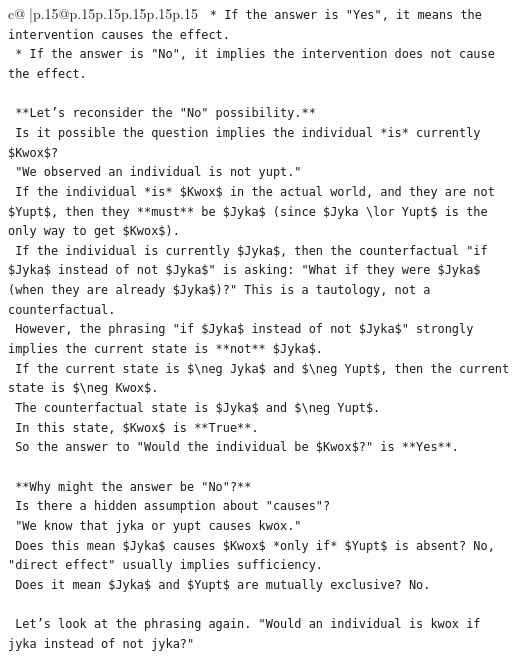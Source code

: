 \documentclass{article}
\begin{document}
{\begin{supertabular}{c@{$\;$}|p{.15\linewidth}@{}p{.15\linewidth}p{.15\linewidth}p{.15\linewidth}p{.15\linewidth}p{.15\linewidth}}
{{{\texttt{    *   If the answer is "Yes", it means the intervention causes the effect.} \\
\texttt{    *   If the answer is "No", it implies the intervention does not cause the effect.} \\
\\ 
\texttt{    **Let's reconsider the "No" possibility.**} \\
\texttt{    Is it possible the question implies the individual *is* currently \$Kwox\$?} \\
\texttt{    "We observed an individual is not yupt."} \\
\texttt{    If the individual *is* \$Kwox\$ in the actual world, and they are not \$Yupt\$, then they **must** be \$Jyka\$ (since \$Jyka \textbackslash{}lor Yupt\$ is the only way to get \$Kwox\$).} \\
\texttt{    If the individual is currently \$Jyka\$, then the counterfactual "if \$Jyka\$ instead of not \$Jyka\$" is asking: "What if they were \$Jyka\$ (when they are already \$Jyka\$)?" This is a tautology, not a counterfactual.} \\
\texttt{    However, the phrasing "if \$Jyka\$ instead of not \$Jyka\$" strongly implies the current state is **not** \$Jyka\$.} \\
\texttt{    If the current state is \$\textbackslash{}neg Jyka\$ and \$\textbackslash{}neg Yupt\$, then the current state is \$\textbackslash{}neg Kwox\$.} \\
\texttt{    The counterfactual state is \$Jyka\$ and \$\textbackslash{}neg Yupt\$.} \\
\texttt{    In this state, \$Kwox\$ is **True**.} \\
\texttt{    So the answer to "Would the individual be \$Kwox\$?" is **Yes**.} \\
\\ 
\texttt{    **Why might the answer be "No"?**} \\
\texttt{    Is there a hidden assumption about "causes"?} \\
\texttt{    "We know that jyka or yupt causes kwox."} \\
\texttt{    Does this mean \$Jyka\$ causes \$Kwox\$ *only if* \$Yupt\$ is absent? No, "direct effect" usually implies sufficiency.} \\
\texttt{    Does it mean \$Jyka\$ and \$Yupt\$ are mutually exclusive? No.} \\
\\ 
\texttt{    Let's look at the phrasing again. "Would an individual is kwox if jyka instead of not jyka?"} \\
}}}
\end{supertabular}}
\end{document}
